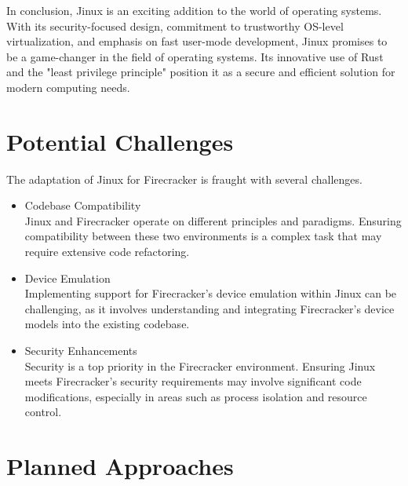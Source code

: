\documentclass[conference]{IEEEtran}
\begin{document}
In conclusion, Jinux is an exciting addition to the world of operating systems. With its security-focused design, commitment to trustworthy OS-level virtualization, and emphasis on fast user-mode development, Jinux promises to be a game-changer in the field of operating systems. Its innovative use of Rust and the "least privilege principle" position it as a secure and efficient solution for modern computing needs.

\section{Potential Challenges}

The adaptation of Jinux for Firecracker is fraught with several challenges.

\begin{itemize}
	\item Codebase Compatibility\\
		Jinux and Firecracker operate on different principles and paradigms. Ensuring compatibility between these two environments is a complex task that may require extensive code refactoring.
	\item Device Emulation\\
		Implementing support for Firecracker's device emulation within Jinux can be challenging, as it involves understanding and integrating Firecracker's device models into the existing codebase.
	\item Security Enhancements\\
		Security is a top priority in the Firecracker environment. Ensuring Jinux meets Firecracker's security requirements may involve significant code modifications, especially in areas such as process isolation and resource control.
\end{itemize}

\section{Planned Approaches}
\end{document}
